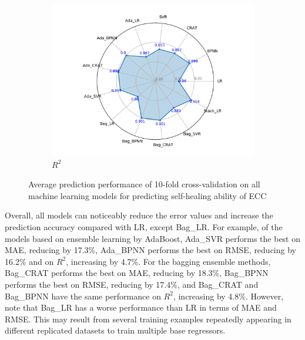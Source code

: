 \documentclass[11pt]{article}
\begin{document}
\begin{figure}[!h]
\begin{subfigure}{.53\textwidth}
			\includegraphics[width = \linewidth]{R2circle.png}
			\caption{$R^2$}
		\end{subfigure}%
		\hspace{1em}
		\caption{Average prediction performance of 10-fold cross-validation on all machine learning models for predicting self-healing ability of ECC }\label{comp}
	\end{figure}
	









	Overall, all models can noticeably reduce the error values and increase the prediction accuracy compared with LR, except Bag\_LR. For example, of the models based on ensemble learning by AdaBoost, Ada\_SVR performs the best on MAE, reducing by 17.3\%, Ada\_BPNN performs the best on RMSE, reducing by 16.2\% and on $R^2$, increasing by 4.7\%. For the bagging ensemble methods, Bag\_CRAT performs the best on MAE, reducing by 18.3\%, Bag\_BPNN performs the best on RMSE, reducing by 17.4\%, and Bag\_CRAT and Bag\_BPNN have the same performance on $R^2$, increasing by 4.8\%. However, note that Bag\_LR has a worse performance than LR in terms of MAE and RMSE. This may result from several training examples repeatedly appearing in different replicated datasets to train multiple base regressors. 
\end{document}

